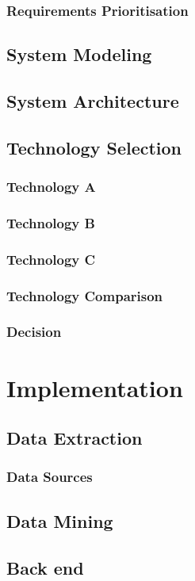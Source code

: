 \documentclass[
  oneside,
  11pt, a4paper,
  footinclude=true,
  headinclude=true,
  cleardoublepage=empty
]{scrbook}
\begin{document}
	\subsection{Requirements Prioritisation}
	\section{System Modeling}
	\section{System Architecture}
	\section{Technology Selection}
	\subsection{Technology A}
	\subsection{Technology B}
	\subsection{Technology C}
	\subsection{Technology Comparison}
	\subsection{Decision}
	
	
	\chapter{Implementation}
	\section{Data Extraction}
	\subsection{Data Sources} %
	\section{Data Mining}
	\section{Back end}
\end{document}
